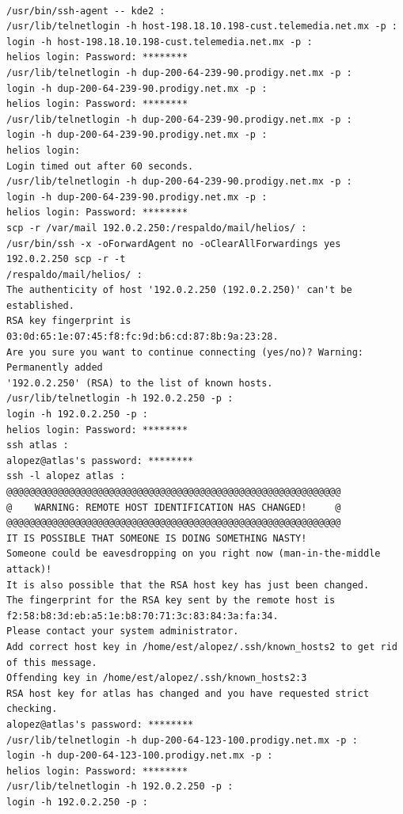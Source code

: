 \vspace{1em}

\begin{lstlisting}[style=terminal]

/usr/bin/ssh-agent -- kde2 :
/usr/lib/telnetlogin -h host-198.18.10.198-cust.telemedia.net.mx -p :
login -h host-198.18.10.198-cust.telemedia.net.mx -p :
helios login: Password: ********
/usr/lib/telnetlogin -h dup-200-64-239-90.prodigy.net.mx -p :
login -h dup-200-64-239-90.prodigy.net.mx -p :
helios login: Password: ********
/usr/lib/telnetlogin -h dup-200-64-239-90.prodigy.net.mx -p :
login -h dup-200-64-239-90.prodigy.net.mx -p :
helios login: 
Login timed out after 60 seconds.
/usr/lib/telnetlogin -h dup-200-64-239-90.prodigy.net.mx -p :
login -h dup-200-64-239-90.prodigy.net.mx -p :
helios login: Password: ********
scp -r /var/mail 192.0.2.250:/respaldo/mail/helios/ :
/usr/bin/ssh -x -oForwardAgent no -oClearAllForwardings yes 192.0.2.250 scp -r -t 
/respaldo/mail/helios/ :
The authenticity of host '192.0.2.250 (192.0.2.250)' can't be established.
RSA key fingerprint is 03:0d:65:1e:07:45:f8:fc:9d:b6:cd:87:8b:9a:23:28.
Are you sure you want to continue connecting (yes/no)? Warning: Permanently added 
'192.0.2.250' (RSA) to the list of known hosts.
/usr/lib/telnetlogin -h 192.0.2.250 -p :
login -h 192.0.2.250 -p :
helios login: Password: ********
ssh atlas :
alopez@atlas's password: ********
ssh -l alopez atlas :
@@@@@@@@@@@@@@@@@@@@@@@@@@@@@@@@@@@@@@@@@@@@@@@@@@@@@@@@@@@
@    WARNING: REMOTE HOST IDENTIFICATION HAS CHANGED!     @
@@@@@@@@@@@@@@@@@@@@@@@@@@@@@@@@@@@@@@@@@@@@@@@@@@@@@@@@@@@
IT IS POSSIBLE THAT SOMEONE IS DOING SOMETHING NASTY!
Someone could be eavesdropping on you right now (man-in-the-middle attack)!
It is also possible that the RSA host key has just been changed.
The fingerprint for the RSA key sent by the remote host is
f2:58:b8:3d:eb:a5:1e:b8:70:71:3c:83:84:3a:fa:34.
Please contact your system administrator.
Add correct host key in /home/est/alopez/.ssh/known_hosts2 to get rid of this message.
Offending key in /home/est/alopez/.ssh/known_hosts2:3
RSA host key for atlas has changed and you have requested strict checking.
alopez@atlas's password: ********
/usr/lib/telnetlogin -h dup-200-64-123-100.prodigy.net.mx -p :
login -h dup-200-64-123-100.prodigy.net.mx -p :
helios login: Password: ********
/usr/lib/telnetlogin -h 192.0.2.250 -p :
login -h 192.0.2.250 -p :
\end{lstlisting}

\vspace{1em}

